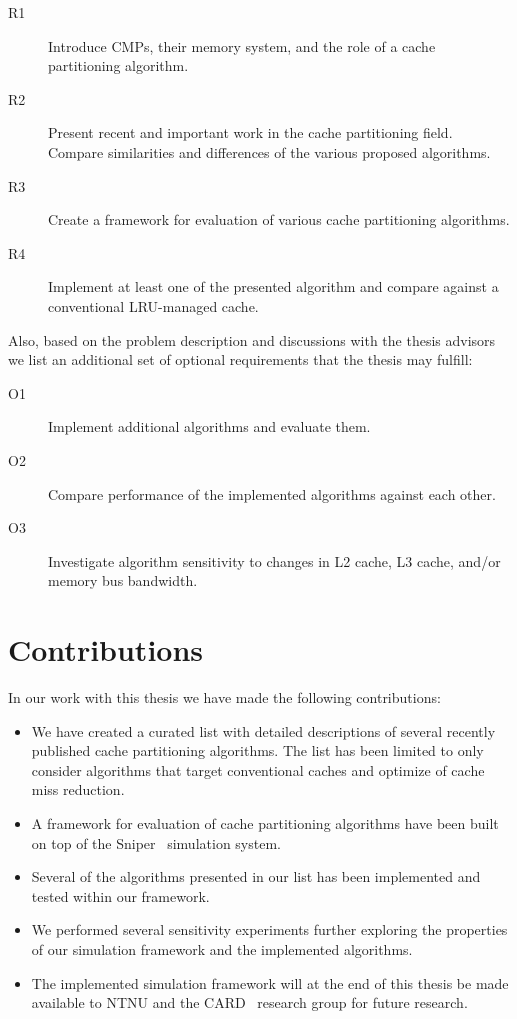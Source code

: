 \begin{description}
    \item[R1] Introduce CMPs, their memory system, and the role of a cache partitioning algorithm.
    \item[R2] Present recent and important work in the cache partitioning field. Compare similarities and differences of the various proposed algorithms.
    \item[R3] Create a framework for evaluation of various cache partitioning algorithms.
    \item[R4] Implement at least one of the presented algorithm and compare against a conventional LRU-managed cache.
\end{description}

Also, based on the problem description and discussions with the thesis advisors we list an additional set of optional requirements that the thesis may fulfill:

\begin{description}
    \item[O1] Implement additional algorithms and evaluate them.
    \item[O2] Compare performance of the implemented algorithms against each other.
    \item[O3] Investigate algorithm sensitivity to changes in L2 cache, L3 cache, and/or memory bus bandwidth.
\end{description}

\section{Contributions}

In our work with this thesis we have made the following contributions:

\begin{itemize}
  \item We have created a curated list with detailed descriptions of several recently published cache partitioning algorithms. The list has been limited to only consider algorithms that target conventional caches and optimize of cache miss reduction.
  \item A framework for evaluation of cache partitioning algorithms have been built on top of the Sniper~\cite{Carlson2011a} simulation system.
  \item Several of the algorithms presented in our list has been implemented and tested within our framework.
  \item We performed several sensitivity experiments further exploring the properties of our simulation framework and the implemented algorithms.
  \item The implemented simulation framework will at the end of this thesis be made available to NTNU and the CARD~\cite{CARD2015} research group for future research.
\end{itemize}

